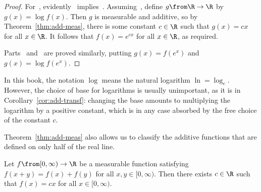 \begin{proof}
For~, evidently~
implies~.  Assuming~, define $g \from \R \to
\R$ by $g(x) = \log f(x)$.  Then $g$ is measurable and additive, so by
Theorem~\ref{thm:add-meas}, there is some constant $c \in \R$ such that
$g(x) = cx$ for all $x \in \R$.  It follows that $f(x) = e^{cx}$ for all $x
\in \R$, as required.

Parts~ and~ are proved
similarly, putting $g(x) = f(e^x)$ and $g(x) = \log f(e^x)$.
\end{proof}

\begin{remark}
In this book, the notation $\log$ means the natural logarithm $\ln
= \log_e$.  However, the choice of base for logarithms is usually
unimportant, as it is in
Corollary~\ref{cor:add-transf}: changing the base
amounts to multiplying the logarithm by a positive constant, which is
in any case absorbed by the free choice of the constant $c$.
\end{remark}

Theorem~\ref{thm:add-meas} also allows us to classify the additive
functions that are defined on only half of the real line.

\begin{cor}
Let $f \from [0, \infty) \to \R$ be a measurable function satisfying $f(x +
  y) = f(x) + f(y)$ for all $x, y \in [0, \infty)$.  Then there exists $c
    \in \R$ such that $f(x) = cx$ for all $x \in [0, \infty)$.    
\end{cor}

